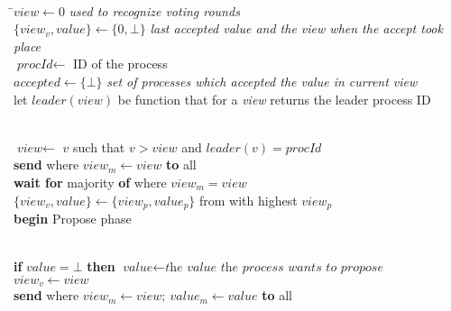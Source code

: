 \begin{table}
\begin{description}
\small
 \item[Initialisation]
  \begin{tabbing}
   \\
   \=$\textit{view} \leftarrow 0$ \hspace{7em} \=\textsl{used to recognize voting rounds}\\
   \>$\{\textit{view}_v, \textit{value}\} \leftarrow \{0, \bot\}$ \>\textsl{last accepted value and the view when the accept took place} \\
   \>$\textit{procId} \leftarrow $ ID of the process \\
   \>$\textit{accepted} \leftarrow \{ \bot \} $ \>\textsl{set of processes which accepted the value in current view} \\
   \>let $leader(\textit{view})$ be function that for a \textit{view} returns the leader process ID
   \vspace{-2em}
   \end{tabbing}

 \vspace{-0.5em}
 \item[Prepare phase] \strut \\
   $\textit{view} \leftarrow $ $v$ such that $ v > \textit{view}$ and $leader(v) = \textit{procId}$\\
   \textbf{send}  where $\textit{view}_m \leftarrow \textit{view}$ \textbf{to} all\\
   \textbf{wait for} majority \textbf{of}  where $\textit{view}_m = \textit{view}$\\
   $\{\textit{view}_v, \textit{value}\} \leftarrow \{\textit{view}_p,\textit{value}_p\} $ from \prepareOK with highest $\textit{view}_p$\\
   \textbf{begin} Propose phase

 \vspace{-0.5em}
 \item[Propose phase] \strut \\
   \textbf{if} $\textit{value} = \bot$ \textbf{then} $\textit{value} \leftarrow \textit{the value the process wants to propose}$\\
   $\textit{view}_v \leftarrow \textit{view}$ \\
   \textbf{send}  where $\textit{view}_m \leftarrow \textit{view};~\textit{value}_m \leftarrow \textit{value}$ \textbf{to} all


\end{description}
\end{table}
